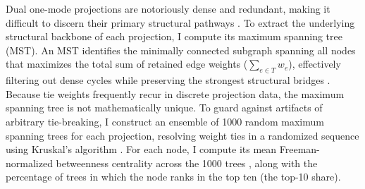 \documentclass[11pt]{article}
\begin{document}
Dual one-mode projections are notoriously dense and redundant, making it difficult to discern their primary structural pathways \citep{neal2014backbone-b29}. To extract the underlying structural backbone of each projection, I compute its maximum spanning tree (MST). An MST identifies the minimally connected subgraph spanning all nodes that maximizes the total sum of retained edge weights ($\sum_{e \in T} w_e$), effectively filtering out dense cycles while preserving the strongest structural bridges \citep{kruskal1956}. Because tie weights frequently recur in discrete projection data, the maximum spanning tree is not mathematically unique. To guard against artifacts of arbitrary tie-breaking, I construct an ensemble of 1000 random maximum spanning trees for each projection, resolving weight ties in a randomized sequence using Kruskal's algorithm \citep{kruskal1956}. For each node, I compute its mean Freeman-normalized betweenness centrality across the 1000 trees \citep{freeman1978centrality-724}, along with the percentage of trees in which the node ranks in the top ten (the top-10 share).
\end{document}
